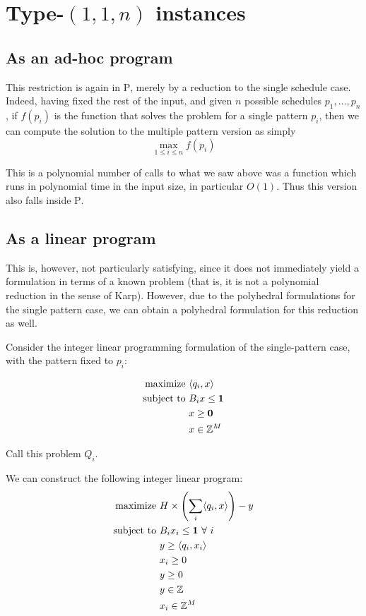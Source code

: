 \section{Type-$(1, 1, n)$ instances}

\subsection{As an ad-hoc program}
This restriction is again in \textsc{P}, merely by a reduction to the single schedule case. Indeed, having fixed the rest of the input, and given $n$ possible schedules $p_1, \dots, p_n$, if $f(p_i)$ is the function that solves the problem for a single pattern $p_i$, then we can compute the solution to the multiple pattern version as simply
$$
\max_{1 \le i \le n} f(p_i)
$$

This is a polynomial number of calls to what we saw above was a function which runs in polynomial time in the input size, in particular $O(1)$. Thus this version also falls inside \textsc{P}.

\subsection{As a linear program}
This is, however, not particularly satisfying, since it does not immediately yield a formulation in terms of a known problem (that is, it is not a polynomial reduction in the sense of Karp). However, due to the polyhedral formulations for the single pattern case, we can obtain a polyhedral formulation for this reduction as well.

Consider the integer linear programming formulation of the single-pattern case, with the pattern fixed to $p_i$:

\begin{alignat*}{2}
  \text{maximize } & \langle q_i, x \rangle \\
  \text{subject to } & B_i x \le \mathbf{1}\\
                     & x \ge \mathbf{0}\\
                     & x \in \mathbb{Z}^M
\end{alignat*}

Call this problem $Q_i$.

We can construct the following integer linear program:
\begin{alignat*}{2}
  \text{maximize } & H \times \left(\sum_i \langle q_i, x \rangle\right) - y\\
  \text{subject to } & B_i x_i \le \mathbf{1}\ \forall\ i\\
                     & y \ge \langle q_i, x_i \rangle\\
                     & x_i \ge 0\\
                     & y \ge 0\\
                     & y \in \mathbb{Z}\\
                     & x_i \in \mathbb{Z}^M
\end{alignat*}

